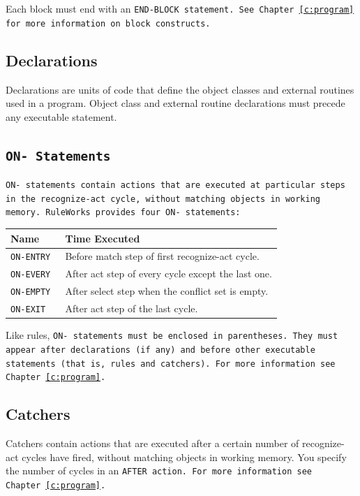 Each block must end with an \tt{END-BLOCK} statement. See
Chapter~\ref{c:program} for more information on block constructs.

\subsection{Declarations}

Declarations are units of code that define the object classes and
external routines used in a program. Object class and external routine
declarations must precede any executable statement.

\subsection{\tt{ON-} Statements}

\tt{ON-} statements contain actions that are executed at particular
steps in the recognize-act cycle, without matching objects in working
memory. RuleWorks provides four \tt{ON-} statements:

\begin{center}
\begin{tabular}{ll}
    \toprule
    Name     & Time Executed               \\
    \midrule
    \tt{ON-ENTRY} & Before match step of first recognize-act cycle. \\
    \tt{ON-EVERY} & After act step of every cycle except the last one. \\
    \tt{ON-EMPTY} & After select step when the conflict set is empty. \\
    \tt{ON-EXIT}  & After act step of the last cycle.  \\
  \bottomrule
\end{tabular}
\end{center}

Like rules, \tt{ON-} statements must be enclosed in parentheses. They
must appear after declarations (if any) and before other executable
statements (that is, rules and catchers). For more information see
Chapter~\ref{c:program}.

\subsection{Catchers}

Catchers contain actions that are executed after a certain number of
recognize-act cycles have fired, without matching objects in working
memory. You specify the number of cycles in an \tt{AFTER} action. For
more information see Chapter~\ref{c:program}.

